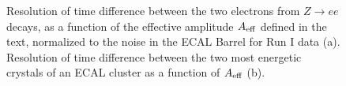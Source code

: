 \documentclass[journal]{IEEEtran}
\begin{document}
\begin{figure}[!t]
  \begin{center}
    \caption{Resolution of time difference between the two electrons from $Z\to ee$ decays, as a function of the effective amplitude $A_{\rm eff}$ defined in the text, normalized to the noise in the ECAL Barrel for Run I data (a). Resolution of time difference between the two most energetic crystals of an ECAL cluster as a function of $A_{\rm eff}$ (b). \label{fig:time_resol}}
  \end{center}
\end{figure}
%
\end{document}

